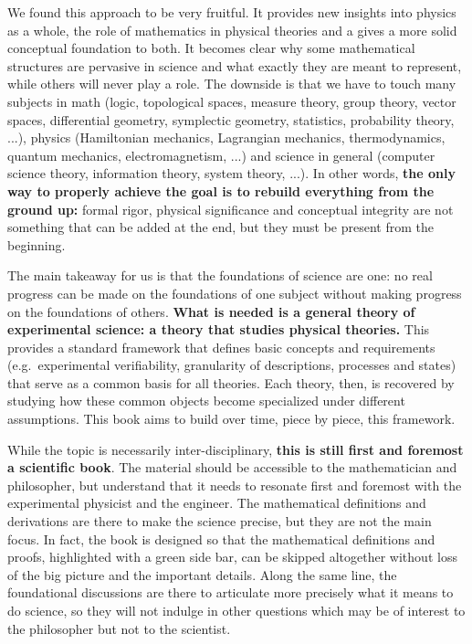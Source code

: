 \documentclass[11pt,letterpaper,fleqn]{memoir} %
\begin{document}
We found this approach to be very fruitful. It provides new insights into physics as a whole, the role of mathematics in physical theories and a gives a more solid conceptual foundation to both. It becomes clear why some mathematical structures are pervasive in science and what exactly they are meant to represent, while others will never play a role. The downside is that we have to touch many subjects in math (logic, topological spaces, measure theory, group theory, vector spaces, differential geometry, symplectic geometry, statistics, probability theory, ...), physics (Hamiltonian mechanics, Lagrangian mechanics, thermodynamics, quantum mechanics, electromagnetism, ...) and science in general (computer science theory, information theory, system theory, ...). In other words, \textbf{the only way to properly achieve the goal is to rebuild everything from the ground up:} formal rigor, physical significance and conceptual integrity are not something that can be added at the end, but they must be present from the beginning.

The main takeaway for us is that the foundations of science are one: no real progress can be made on the foundations of one subject without making progress on the foundations of others. \textbf{What is needed is a general theory of experimental science: a theory that studies physical theories.} This provides a standard framework that defines basic concepts and requirements (e.g.~experimental verifiability, granularity of descriptions, processes and states) that serve as a common basis for all theories. Each theory, then, is recovered by studying how these common objects become specialized under different assumptions. This book aims to build over time, piece by piece, this framework.

While the topic is necessarily inter-disciplinary, \textbf{this is still first and foremost a scientific book}. The material should be accessible to the mathematician and philosopher, but understand that it needs to resonate first and foremost with the experimental physicist and the engineer. The mathematical definitions and derivations are there to make the science precise, but they are not the main focus. In fact, the book is designed so that the mathematical definitions and proofs, highlighted with a green side bar, can be skipped altogether without loss of the big picture and the important details. Along the same line, the foundational discussions are there to articulate more precisely what it means to do science, so they will not indulge in other questions which may be of interest to the philosopher but not to the scientist.
\end{document}
